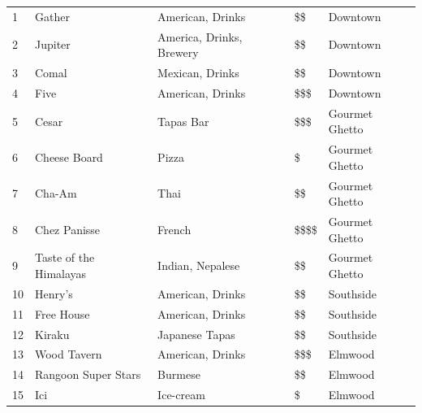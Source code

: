 \begingroup
\small
\begin{multicols}{1}[]
    \begin{tabular}{p{0.3cm} p{4cm} p{5cm} p{1cm} p{2cm}}
        1 & Gather & American, Drinks & \$\$ & Downtown \\
        2 & Jupiter & America, Drinks, Brewery & \$\$ & Downtown \\
	    3 & Comal & Mexican, Drinks & \$\$ & Downtown \\       
	    4 & Five & American, Drinks & \$\$\$ & Downtown \\ 
        5 & Cesar & Tapas Bar & \$\$\$ & Gourmet Ghetto\\
        6 & Cheese Board & Pizza & \$ & Gourmet Ghetto \\
        7 & Cha-Am & Thai & \$\$ & Gourmet Ghetto\\
        8 & Chez Panisse & French & \$\$\$\$ & Gourmet Ghetto \\
        9 & Taste of the Himalayas & Indian, Nepalese & \$\$ & Gourmet Ghetto \\
        10 & Henry's & American, Drinks & \$\$ & Southside \\
        11 & Free House & American, Drinks & \$\$ & Southside \\
        12 & Kiraku & Japanese Tapas & \$\$ & Southside \\
        13 & Wood Tavern & American, Drinks & \$\$\$ & Elmwood \\
        14 & Rangoon Super Stars & Burmese & \$\$ & Elmwood\\
        15 & Ici & Ice-cream & \$ & Elmwood\\
    \end{tabular}
\end{multicols}
\endgroup
\normalsize 

\setlength\fboxrule{0pt}
